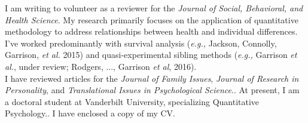 \documentclass[10pt,stdletter,dateno,sigleft]{newlfm} %
\newcommand{\Purpose}{volunteer as a reviewer for \Journal}
\newcommand{\Justification}{My research primarily focuses on the application of quantitative methodology to address relationships between health and individual differences. I've worked predominantly with survival analysis (\textit{e.g.,} Jackson, Connolly, Garrison, \textit{et al.} 2015) and quasi-experimental sibling methods (\textit{e.g.,} Garrison \textit{et al.}, under review; Rodgers, ..., Garrison \textit{et al}, 2016)}
\newcommand{\Experience}{I have reviewed articles for the \textit{Journal of Family  Issues}, \textit{Journal of Research in Personality}, and \textit{Translational Issues in Psychological Science}.}
\newcommand{\Education}{At present, I am a doctoral student at Vanderbilt University, specializing Quantitative Psychology.}
\newcommand{\Journal}{the \textit{Journal of Social, Behavioral, and Health Science}\xspace}
\begin{document}
\begin{newlfm}


I am writing to \Purpose. \Justification. \\

\Experience. \Education. I have enclosed a copy of my CV.




\end{newlfm}
\end{document}
